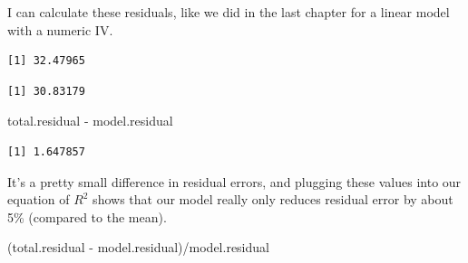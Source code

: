 \documentclass[
  letterpaper,
  DIV=11,
  numbers=noendperiod,
  oneside]{scrreprt}
\newenvironment{Shaded}{\begin{snugshade}}{\end{snugshade}}
\newcommand{\AttributeTok}[1]{\textcolor[rgb]{0.40,0.45,0.13}{#1}}
\newcommand{\CommentTok}[1]{\textcolor[rgb]{0.37,0.37,0.37}{#1}}
\newcommand{\DecValTok}[1]{\textcolor[rgb]{0.68,0.00,0.00}{#1}}
\newcommand{\FunctionTok}[1]{\textcolor[rgb]{0.28,0.35,0.67}{#1}}
\newcommand{\NormalTok}[1]{\textcolor[rgb]{0.00,0.23,0.31}{#1}}
\newcommand{\OtherTok}[1]{\textcolor[rgb]{0.00,0.23,0.31}{#1}}
\newcommand{\SpecialCharTok}[1]{\textcolor[rgb]{0.37,0.37,0.37}{#1}}
\begin{document}
I can calculate these residuals, like we did in the last chapter for a
linear model with a numeric IV.

\begin{Shaded}
\end{Shaded}

\begin{verbatim}
[1] 32.47965
\end{verbatim}

\begin{Shaded}
\end{Shaded}

\begin{verbatim}
[1] 30.83179
\end{verbatim}

\begin{Shaded}
\begin{Highlighting}[]
\NormalTok{total.residual }\SpecialCharTok{{-}}\NormalTok{ model.residual}
\end{Highlighting}
\end{Shaded}

\begin{verbatim}
[1] 1.647857
\end{verbatim}

It's a pretty small difference in residual errors, and plugging these
values into our equation of \(R^2\) shows that our model really only
reduces residual error by about 5\% (compared to the mean).

\begin{Shaded}
\begin{Highlighting}[]
\NormalTok{(total.residual }\SpecialCharTok{{-}}\NormalTok{ model.residual)}\SpecialCharTok{/}\NormalTok{model.residual}
\end{Highlighting}
\end{Shaded}
\end{document}
